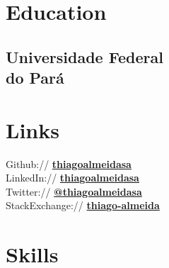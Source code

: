 \documentclass[]{deedy-resume-openfont}
\begin{document}
%
%
\lastupdated

%
%

%
%

\begin{minipage}[t]{0.33\textwidth}


    \section{Education}

    \subsection[Universidade Federal do Pará]{Universidade Federal
    \\ do Pará}
    \sectionsep



    \section{Links}
    Github:// \href{https://github.com/thiagoalmeidasa}{\bf thiagoalmeidasa} \\
    LinkedIn://  \href{https://www.linkedin.com/in/thiagoalmeidasa}{\bf thiagoalmeidasa} \\
    Twitter://  \href{https://twitter.com/thiagoalmeidasa}{\bf @thiagoalmeidasa} \\
    StackExchange:// \href{https://stackexchange.com/users/3720131/thiago-almeida?tab=accounts}{\bf thiago-almeida}


    \sectionsep
    \section{Skills}

\end{minipage}
\end{document}
